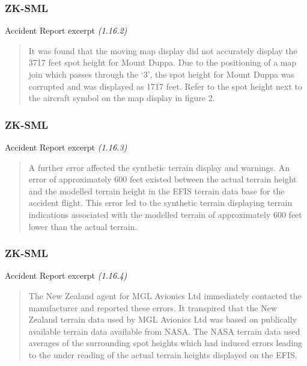 \begin{frame}
\frametitle{ZK-SML}
\begin{block}{Accident Report excerpt \tiny{\emph{(1.16.2)}}}
\begin{quote}
It was found that the moving map display did not accurately display the 3717 feet spot height for Mount Duppa.  Due to the positioning of a map join which passes through the `3', the spot height for Mount Duppa was corrupted and was displayed as 1717 feet.  Refer to the spot height next to the aircraft symbol on the map display in figure 2. 
\end{quote}
\end{block}
\end{frame}

\begin{frame}
\frametitle{ZK-SML}
\begin{block}{Accident Report excerpt \tiny{\emph{(1.16.3)}}}
\begin{quote}
A further error affected the synthetic terrain display and warnings.  An error of approximately 600 feet existed between the actual terrain height and the modelled terrain height in the EFIS terrain data base for the accident flight.  This error led to the synthetic terrain displaying terrain indications associated with the modelled terrain of approximately 600 feet lower than the actual terrain. 
\end{quote}
\end{block}
\end{frame}

\begin{frame}
\frametitle{ZK-SML}
\begin{block}{Accident Report excerpt \tiny{\emph{(1.16.4)}}}
\begin{quote}
The New Zealand agent for MGL Avionics Ltd immediately contacted the manufacturer and reported these errors.  It transpired that the New Zealand terrain data used by MGL Avionics Ltd was based on publically available terrain data available from NASA.  The NASA terrain data used averages of the surrounding spot heights which had induced errors leading to the under reading of the actual terrain heights displayed on the EFIS. 
\end{quote}
\end{block}
\end{frame}
